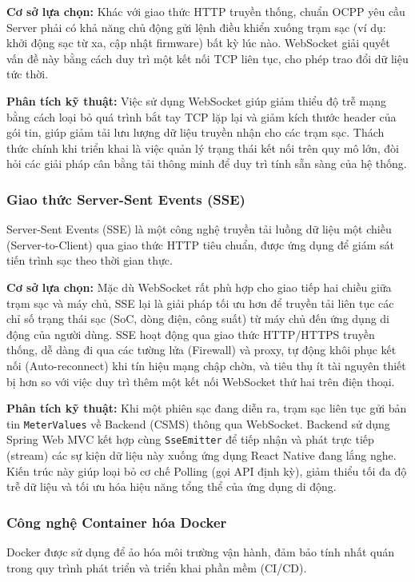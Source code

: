 \textbf{Cơ sở lựa chọn:}
Khác với giao thức HTTP truyền thống, chuẩn OCPP yêu cầu Server phải có khả năng chủ động gửi lệnh điều khiển xuống trạm sạc (ví dụ: khởi động sạc từ xa, cập nhật firmware) bất kỳ lúc nào. WebSocket giải quyết vấn đề này bằng cách duy trì một kết nối TCP liên tục, cho phép trao đổi dữ liệu tức thời.

\textbf{Phân tích kỹ thuật:}
Việc sử dụng WebSocket giúp giảm thiểu độ trễ mạng bằng cách loại bỏ quá trình bắt tay TCP lặp lại và giảm kích thước header của gói tin, giúp giảm tải lưu lượng dữ liệu truyền nhận cho các trạm sạc. Thách thức chính khi triển khai là việc quản lý trạng thái kết nối trên quy mô lớn, đòi hỏi các giải pháp cân bằng tải thông minh để duy trì tính sẵn sàng của hệ thống.

\subsubsection{Giao thức Server-Sent Events (SSE)}
Server-Sent Events (SSE) \cite{sse_mdn} là một công nghệ truyền tải luồng dữ liệu một chiều (Server-to-Client) qua giao thức HTTP tiêu chuẩn, được ứng dụng để giám sát tiến trình sạc theo thời gian thực.

\textbf{Cơ sở lựa chọn:}
Mặc dù WebSocket rất phù hợp cho giao tiếp hai chiều giữa trạm sạc và máy chủ, SSE lại là giải pháp tối ưu hơn để truyền tải liên tục các chỉ số trạng thái sạc (SoC, dòng điện, công suất) từ máy chủ đến ứng dụng di động của người dùng. SSE hoạt động qua giao thức HTTP/HTTPS truyền thống, dễ dàng đi qua các tường lửa (Firewall) và proxy, tự động khôi phục kết nối (Auto-reconnect) khi tín hiệu mạng chập chờn, và tiêu thụ ít tài nguyên thiết bị hơn so với việc duy trì thêm một kết nối WebSocket thứ hai trên điện thoại.

\textbf{Phân tích kỹ thuật:}
Khi một phiên sạc đang diễn ra, trạm sạc liên tục gửi bản tin \texttt{MeterValues} về Backend (CSMS) thông qua WebSocket. Backend sử dụng Spring Web MVC kết hợp cùng \texttt{SseEmitter} để tiếp nhận và phát trực tiếp (stream) các sự kiện dữ liệu này xuống ứng dụng React Native đang lắng nghe. Kiến trúc này giúp loại bỏ cơ chế Polling (gọi API định kỳ), giảm thiểu tối đa độ trễ dữ liệu và tối ưu hóa hiệu năng tổng thể của ứng dụng di động.

\subsubsection{Công nghệ Container hóa Docker}
Docker \cite{docker_docs} được sử dụng để ảo hóa môi trường vận hành, đảm bảo tính nhất quán trong quy trình phát triển và triển khai phần mềm (CI/CD).

